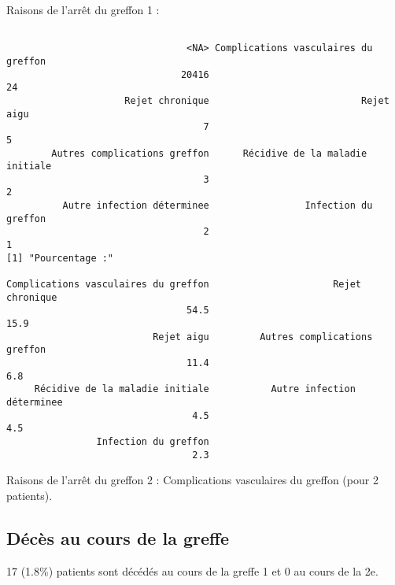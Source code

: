 \documentclass[11pt,a4paper]{article}\usepackage[]{graphicx}\usepackage[]{color}
\makeatletter
\newenvironment{kframe}{%
 \def\at@end@of@kframe{}%
 \ifinner\ifhmode%
  \def\at@end@of@kframe{\end{minipage}}%
  \begin{minipage}{\columnwidth}%
 \fi\fi%
 \def\FrameCommand##1{\hskip\@totalleftmargin \hskip-\fboxsep
 \colorbox{shadecolor}{##1}\hskip-\fboxsep
     \hskip-\linewidth \hskip-\@totalleftmargin \hskip\columnwidth}%
 \MakeFramed {\advance\hsize-\width
   \@totalleftmargin\z@ \linewidth\hsize
   \@setminipage}}%
 {\par\unskip\endMakeFramed%
 \at@end@of@kframe}
\newenvironment{knitrout}{}{} %
\makeatother
\begin{document}
Raisons de l'arrêt du greffon 1 :
\begin{knitrout}
\color{fgcolor}\begin{kframe}
\begin{verbatim}

                                <NA> Complications vasculaires du greffon 
                               20416                                   24 
                     Rejet chronique                           Rejet aigu 
                                   7                                    5 
        Autres complications greffon      Récidive de la maladie initiale 
                                   3                                    2 
          Autre infection déterminee                 Infection du greffon 
                                   2                                    1 
[1] "Pourcentage :"

Complications vasculaires du greffon                      Rejet chronique 
                                54.5                                 15.9 
                          Rejet aigu         Autres complications greffon 
                                11.4                                  6.8 
     Récidive de la maladie initiale           Autre infection déterminee 
                                 4.5                                  4.5 
                Infection du greffon 
                                 2.3 
\end{verbatim}
\end{kframe}
\end{knitrout}

Raisons de l'arrêt du greffon 2 : Complications vasculaires du greffon  (pour 2 patients).

  \subsection{Décès au cours de la greffe}

17 (1.8\%) patients sont décédés au cours de la greffe 1 et 0 au cours de la 2e.
\end{document}
